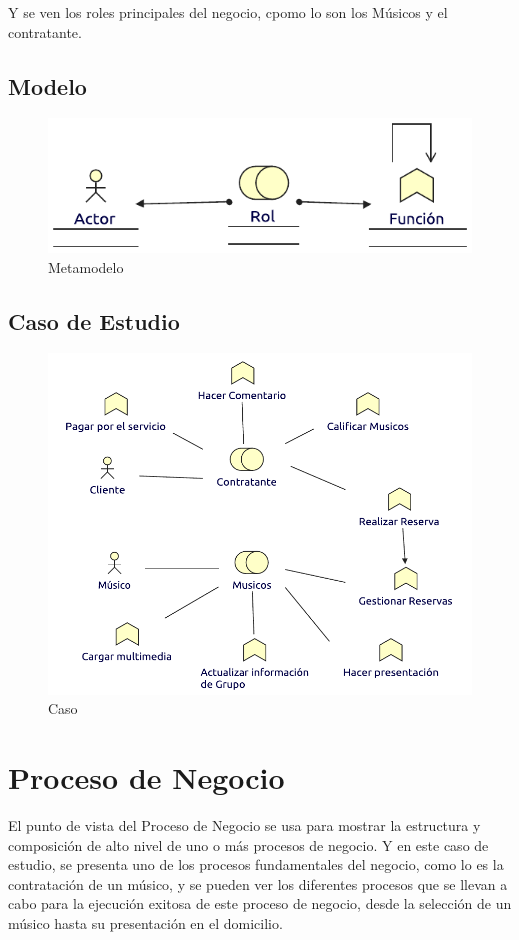 Y se ven los roles principales del negocio, cpomo lo son los Músicos y el contratante. 

\subsection{Modelo}
\begin{figure}[h!]
	\centering
	\includegraphics[width=0.8\linewidth]{Arquitectura/Negocio/imgs/FuncionNegocioMetamodelo.pdf}
	\caption{Metamodelo}
\end{figure}
\newpage
\subsection{Caso de Estudio}

\begin{figure}[h!]
	\centering
	\includegraphics[width=\linewidth]{Arquitectura/Negocio/imgs/FuncionNegocio.pdf}
	\caption{Caso}
\end{figure}
\newpage

\section{Proceso de Negocio}
El punto de vista del Proceso de Negocio se usa para mostrar la estructura y composición de alto nivel de uno o más procesos de negocio. Y en este caso de estudio, se presenta uno de los procesos fundamentales del negocio, como lo es la contratación de un músico, y se pueden ver los diferentes procesos que se llevan a cabo para la ejecución exitosa de este proceso de negocio, desde la selección de un músico hasta su presentación en el domicilio.
